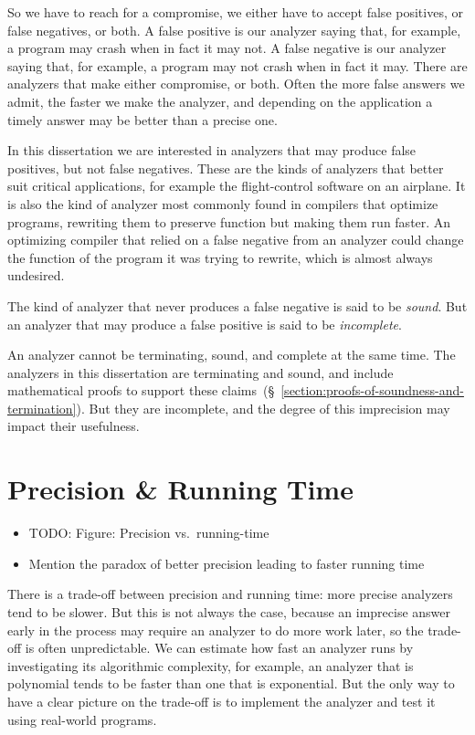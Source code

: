 \documentclass[12pt, oneside]{book}
\begin{document}
So we have to reach for a compromise, we either have to accept false positives, or false negatives, or both. A false positive is our analyzer saying that, for example, a program may crash when in fact it may not. A false negative is our analyzer saying that, for example, a program may not crash when in fact it may. There are analyzers that make either compromise, or both. Often the more false answers we admit, the faster we make the analyzer, and depending on the application a timely answer may be better than a precise one.

In this dissertation we are interested in analyzers that may produce false positives, but not false negatives. These are the kinds of analyzers that better suit critical applications, for example the flight-control software on an airplane. It is also the kind of analyzer most commonly found in compilers that optimize programs, rewriting them to preserve function but making them run faster. An optimizing compiler that relied on a false negative from an analyzer could change the function of the program it was trying to rewrite, which is almost always undesired.

The kind of analyzer that never produces a false negative is said to be \emph{sound}. But an analyzer that may produce a false positive is said to be \emph{incomplete}.

An analyzer cannot be terminating, sound, and complete at the same time. The analyzers in this dissertation are terminating and sound, and include mathematical proofs to support these claims~(§~\ref{section:proofs-of-soundness-and-termination}). But they are incomplete, and the degree of this imprecision may impact their usefulness.

\section{Precision \& Running Time}
\label{section:precision-and-running-time}

\begin{itemize}
  \item TODO: Figure: Precision vs.\ running-time
  \item Mention the paradox of better precision leading to faster running time
\end{itemize}

There is a trade-off between precision and running time: more precise analyzers tend to be slower. But this is not always the case, because an imprecise answer early in the process may require an analyzer to do more work later, so the trade-off is often unpredictable. We can estimate how fast an analyzer runs by investigating its algorithmic complexity, for example, an analyzer that is polynomial tends to be faster than one that is exponential. But the only way to have a clear picture on the trade-off is to implement the analyzer and test it using real-world programs.
\end{document}
